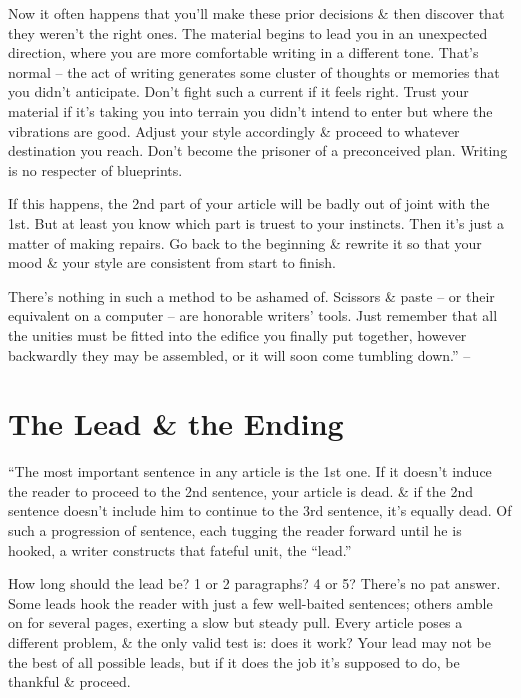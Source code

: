 \documentclass{article}
\begin{document}
Now it often happens that you'll make these prior decisions \& then discover that they weren't the right ones. The material begins to lead you in an unexpected direction, where you are more comfortable writing in a different tone. That's normal -- the act of writing generates some cluster of thoughts or memories that you didn't anticipate. Don't fight such a current if it feels right. Trust your material if it's taking you into terrain you didn't intend to enter but where the vibrations are good. Adjust your style accordingly \& proceed to whatever destination you reach. Don't become the prisoner of a preconceived plan. Writing is no respecter of blueprints.

If this happens, the 2nd part of your article will be badly out of joint with the 1st. But at least you know which part is truest to your instincts. Then it's just a matter of making repairs. Go back to the beginning \& rewrite it so that your mood \& your style are consistent from start to finish.

There's nothing in such a method to be ashamed of. Scissors \& paste -- or their equivalent on a computer -- are honorable writers' tools. Just remember that all the unities must be fitted into the edifice you finally put together, however backwardly they may be assembled, or it will soon come tumbling down.'' -- \cite[pp. 52--55]{Zinsser2016}


\section{The Lead \& the Ending}
``The most important sentence in any article is the 1st one. If it doesn't induce the reader to proceed to the 2nd sentence, your article is dead. \& if the 2nd sentence doesn't include him to continue to the 3rd sentence, it's equally dead. Of such a progression of sentence, each tugging the reader forward until he is hooked, a writer constructs that fateful unit, the ``lead.''

How long should the lead be? 1 or 2 paragraphs? 4 or 5? There's no pat answer. Some leads hook the reader with just a few well-baited sentences; others amble on for several pages, exerting a slow but steady pull. Every article poses a different problem, \& the only valid test is: does it work? Your lead may not be the best of all possible leads, but if it does the job it's supposed to do, be thankful \& proceed.
\end{document}
